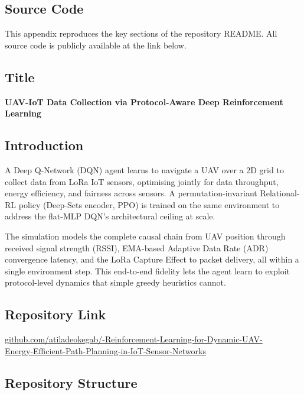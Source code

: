 \clearpage
\subsection{Source Code}
\label{app:repo}

This appendix reproduces the key sections of the repository README. All source code is publicly available at the link below.

\subsection*{Title}

\textbf{UAV-IoT Data Collection via Protocol-Aware Deep Reinforcement Learning}

\subsection*{Introduction}

A Deep Q-Network (DQN) agent learns to navigate a UAV over a 2D grid to collect data from LoRa IoT sensors, optimising jointly for data throughput, energy efficiency, and fairness across sensors. A permutation-invariant Relational-RL policy (Deep-Sets encoder, PPO) is trained on the same environment to address the flat-MLP DQN's architectural ceiling at scale.

The simulation models the complete causal chain from UAV position through received signal strength (RSSI), EMA-based Adaptive Data Rate (ADR) convergence latency, and the LoRa Capture Effect to packet delivery, all within a single environment step. This end-to-end fidelity lets the agent learn to exploit protocol-level dynamics that simple greedy heuristics cannot.

\subsection*{Repository Link}

\begin{center}
\href{https://github.com/atiladeokegab/-Reinforcement-Learning-for-Dynamic-UAV-Energy-Efficient-Path-Planning-in-IoT-Sensor-Networks}{\ttfamily\small github.com/atiladeokegab/-Reinforcement-Learning-for-Dynamic-UAV-\\Energy-Efficient-Path-Planning-in-IoT-Sensor-Networks}
\end{center}

\newpage
\subsection*{Repository Structure}

